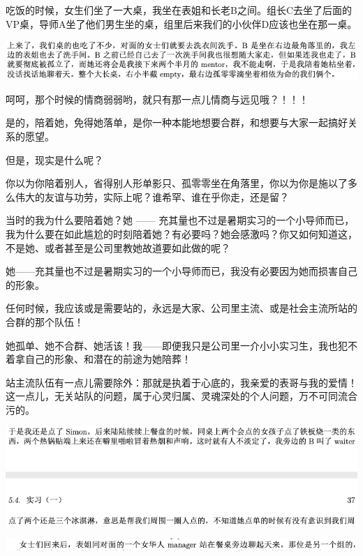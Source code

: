 \documentclass[9pt, b5paper]{article}
\begin{document}
吃饭的时候，女生们坐了一大桌，我坐在表姐和长老B之间。组长C去坐了后面的VP桌，导师A坐了他们男生坐的桌，组里后来我们的小伙伴D应该也坐在那一桌。

\begin{center}
\includegraphics[width=.9\linewidth]{./pic/backups_plans_20210504_211634.png}
\end{center}

呵呵，那个时候的情商弱弱哟，就只有那一点儿情商与远见哦？！！！

是的，陪着她，免得她落单，是你一种本能地想要合群，和想要与大家一起搞好关系的愿望。

但是，现实是什么呢？

你以为你陪着别人，省得别人形单影只、孤零零坐在角落里，你以为你是施以了多么伟大的友谊与功劳，实际上呢？谁希罕、谁在乎你走，还是留？

当时的我为什么要陪着她？她 —— 充其量也不过是暑期实习的一个小导师而已，我为什么要在如此尴尬的时刻陪着她？有必要吗？她会感激吗？你又如何知道这，不是她、或者甚至是公司里教她故道要如此做的呢？

她——充其量也不过是暑期实习的一个小导师而已，我没有必要因为她而损害自己的形象。

任何时候，我应该或是需要站的，永远是大家、公司里主流、或是社会主流所站的合群的那个队伍！

她孤单、她不合群、她活该！我——即便我只是公司里一介小小实习生，我也犯不着拿自己的形象、和潜在的前途为她陪葬！

站主流队伍有一点儿需要除外：那就是执着于心底的，我亲爱的表哥与我的爱情！这一点儿，无关站队的问题，属于心灵归属、灵魂深处的个人问题，万不可同流合污的。

\begin{center}
\includegraphics[width=.9\linewidth]{./pic/backups_plans_20210505_110209.png}
\end{center}

\begin{center}
\includegraphics[width=.9\linewidth]{./pic/backups_plans_20210504_215114.png}
\end{center}
\end{document}
